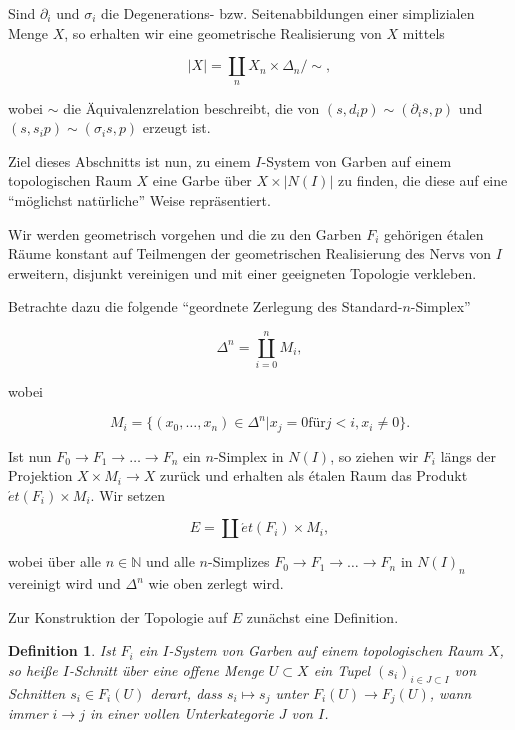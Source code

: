\documentclass[a4paper]{article}
\newtheorem{defn}[satz]{Definition}
\newcommand{\N}{\mathbb{N}}
\newcommand{\del}{\partial}
\newcommand{\et}{\acute{e}t}
\begin{document}
Sind $\del_i$ und $\sigma_i$ die Degenerations- bzw. Seitenabbildungen
einer simplizialen Menge $X$, so erhalten wir eine geometrische
Realisierung von $X$ mittels

$$ |X| = \coprod_n X_n \times \Delta_n / \sim ,$$

wobei $\sim$ die Äquivalenzrelation beschreibt, die von $(s, d_i p) \sim
(\del_i s, p)$ und $(s, s_i p) \sim (\sigma_i s, p)$ erzeugt ist.

Ziel dieses Abschnitts ist nun, zu einem $I$-System von Garben auf
einem topologischen Raum $X$ eine Garbe über $X \times |N(I)|$ zu
finden, die diese auf eine ``möglichst natürliche'' Weise
repräsentiert.

Wir werden geometrisch vorgehen und die zu den Garben $F_i$ gehörigen
étalen Räume konstant auf Teilmengen der geometrischen Realisierung
des Nervs von $I$ erweitern, disjunkt vereinigen und mit einer
geeigneten Topologie verkleben.

Betrachte dazu die folgende ``geordnete Zerlegung des
Standard-$n$-Simplex''

$$\Delta^n = \coprod_{i=0}^n M_i ,$$

wobei

$$M_i = \{(x_0, \dots, x_n) \in \Delta^n | x_j = 0 \text{für} j < i,
x_i \neq 0 \} . $$


Ist nun $F_0 \to F_1 \to \dots \to F_n$ ein $n$-Simplex in $N(I)$, so
ziehen wir $F_i$ längs der Projektion $X \times M_i \to X$ zurück und
erhalten als étalen Raum das Produkt $\et(F_i) \times M_i$. Wir setzen

$$E = \coprod \et(F_i) \times M_i ,$$

wobei über alle $n \in \N$ und alle $n$-Simplizes $F_0 \to F_1 \to
\dots \to F_n$ in $N(I)_n$ vereinigt wird und $\Delta^n$ wie oben
zerlegt wird.


Zur Konstruktion der Topologie auf $E$ zunächst eine Definition.

\begin{defn}
  Ist $F_i$ ein $I$-System von Garben auf einem topologischen Raum
  $X$, so heiße $I$-Schnitt über eine offene Menge $U \subset X$ ein
  Tupel $(s_i)_{i \in J \subset I}$ von Schnitten $s_i \in F_i(U)$
  derart, dass $s_i \mapsto s_j$ unter $F_i(U) \to F_j(U)$, wann immer
  $i \to j$ in einer vollen Unterkategorie $J$ von $I$.

\end{defn}
\end{document}
